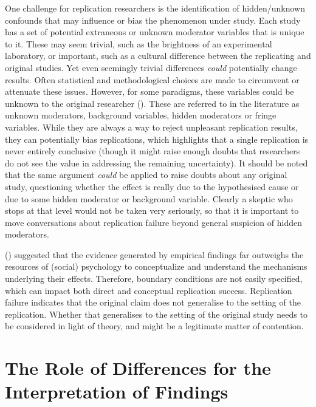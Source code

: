 \documentclass[
  letterpaper,
  DIV=11,
  openany,
  fontsize=12pt,
  parskip=half,
  headings=big,
  numbers=noenddot,
  titlepage=false]{scrreprt}
\begin{document}
One challenge for replication researchers is the identification of
hidden/unknown confounds that may influence or bias the phenomenon under
study. Each study has a set of potential extraneous or unknown moderator
variables that is unique to it. These may seem trivial, such as the
brightness of an experimental laboratory, or important, such as a
cultural difference between the replicating and original studies. Yet
even seemingly trivial differences \emph{could }potentially change
results. Often statistical and methodological choices are made to
circumvent or attenuate these issues. However, for some paradigms, these
variables could be unknown to the original researcher
(). These are referred to in the
literature as unknown moderators, background variables, hidden
moderators or fringe variables. While they are always a way to reject
unpleasant replication results, they can potentially bias replications,
which highlights that a single replication is never entirely conclusive
(though it might raise enough doubts that researchers do not see the
value in addressing the remaining uncertainty). It should be noted that
the same argument \emph{could }be applied to raise doubts about any
original study, questioning whether the effect is really due to the
hypothesised cause or due to some hidden moderator or background
variable. Clearly a skeptic who stops at that level would not be taken
very seriously, so that it is important to move conversations about
replication failure beyond general suspicion of hidden moderators.

() suggested that the evidence
generated by empirical findings far outweighs the resources of (social)
psychology to conceptualize and understand the mechanisms underlying
their effects. Therefore, boundary conditions are not easily specified,
which can impact both direct and conceptual replication success.
Replication failure indicates that the original claim does not
generalise to the setting of the replication. Whether that generalises
to the setting of the original study needs to be considered in light of
theory, and might be a legitimate matter of contention.

\section{The Role of Differences for the Interpretation of
Findings}\label{sec-differences-and-interpretation}
\end{document}
